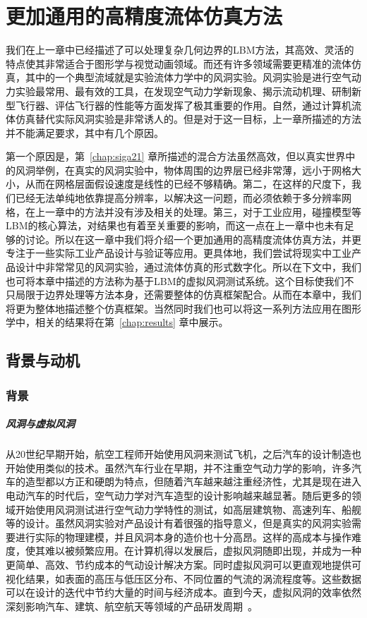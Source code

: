 \chapter{更加通用的高精度流体仿真方法}
\label{chap:sig23}
我们在上一章中已经描述了可以处理复杂几何边界的LBM方法，其高效、灵活的特点使其非常适合于图形学与视觉动画领域。而还有许多领域需要更精准的流体仿真，其中的一个典型流域就是实验流体力学中的风洞实验。风洞实验是进行空气动力实验最常用、最有效的工具，在发现空气动力学新现象、揭示流动机理、研制新型飞行器、评估飞行器的性能等方面发挥了极其重要的作用。自然，通过计算机流体仿真替代实际风洞实验是非常诱人的。但是对于这一目标，上一章所描述的方法并不能满足要求，其中有几个原因。

第一个原因是，第~\ref{chap:siga21} 章所描述的混合方法虽然高效，但以真实世界中的风洞举例，在真实的风洞实验中，物体周围的边界层已经非常薄，远小于网格大小，从而在网格层面假设速度是线性的已经不够精确。第二，在这样的尺度下，我们已经无法单纯地依靠提高分辨率，以解决这一问题，而必须依赖于多分辨率网格，在上一章中的方法并没有涉及相关的处理。第三，对于工业应用，碰撞模型等LBM的核心算法，对结果也有着至关重要的影响，而这一点在上一章中也未有足够的讨论。所以在这一章中我们将介绍一个更加通用的高精度流体仿真方法，并更专注于一些实际工业产品设计与验证等应用。更具体地，我们尝试将现实中工业产品设计中非常常见的风洞实验，通过流体仿真的形式数字化。所以在下文中，我们也可将本章中描述的方法称为基于LBM的虚拟风洞测试系统。这个目标使我们不只局限于边界处理等方法本身，还需要整体的仿真框架配合。从而在本章中，我们将更为整体地描述整个仿真框架。当然同时我们也可以将这一系列方法应用在图形学中，相关的结果将在第~\ref{chap:results} 章中展示。

\section{背景与动机}
\subsection{背景}
\paragraph{风洞与虚拟风洞}
从20世纪早期开始，航空工程师开始使用风洞来测试飞机，之后汽车的设计制造也开始使用类似的技术。虽然汽车行业在早期，并不注重空气动力学的影响，许多汽车的造型都以方正和硬朗为特点，但随着汽车越来越注重经济性，尤其是现在进入电动汽车的时代后，空气动力学对汽车造型的设计影响越来越显著。随后更多的领域开始使用风洞测试进行空气动力学特性的测试，如高层建筑物、高速列车、船舰等的设计。虽然风洞实验对产品设计有着很强的指导意义，但是真实的风洞实验需要进行实际的物理建模，并且风洞本身的造价也十分高昂。这样的高成本与操作难度，使其难以被频繁应用。在计算机得以发展后，虚拟风洞随即出现，并成为一种更简单、高效、节约成本的气动设计解决方案。同时虚拟风洞可以更直观地提供可视化结果，如表面的高压与低压区分布、不同位置的气流的涡流程度等。这些数据可以在设计的迭代中节约大量的时间与经济成本。直到今天，虚拟风洞的效率依然深刻影响汽车、建筑、航空航天等领域的产品研发周期~\citep{HighriseBuildings,windScience}。

